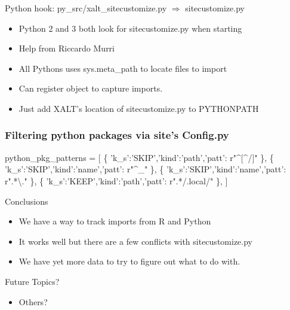 \documentclass{beamer}
\begin{document}
\begin{frame}{Python hook: py\_src/xalt\_sitecustomize.py $\Rightarrow$ sitecustomize.py}
  \begin{itemize}
    \item Python 2 and 3 both look for  sitecustomize.py when starting
    \item Help from Riccardo Murri
    \item All Pythons uses sys.meta\_path to locate files to import
    \item Can register object to capture imports.
    \item Just add XALT's location of sitecustomize.py to PYTHONPATH
  \end{itemize}
\end{frame}

\begin{frame}[fragile]
    \frametitle{Filtering python packages via site's Config.py}
 {\small
    \begin{semiverbatim}
python\_pkg\_patterns = [
\{ 'k\_s':'SKIP','kind':'path','patt': r"^[^/]" \},
\{ 'k\_s':'SKIP','kind':'name','patt': r"^_"    \},
\{ 'k\_s':'SKIP','kind':'name','patt': r".*\textbackslash." \},
\{ 'k\_s':'KEEP','kind':'path','patt': r".*/.local/" \},
]
    \end{semiverbatim}
}
\end{frame}

\begin{frame}{Conclusions}
  \begin{itemize}
    \item We have a way to track imports from R and Python
    \item It works well but there are a few conflicts with
      sitecustomize.py
    \item We have yet more data to try to figure out what to do with.
  \end{itemize}
\end{frame}


\begin{frame}{Future Topics?}
  \begin{itemize}
    \item Others?
  \end{itemize}
\end{frame}
%

%
\end{document}
